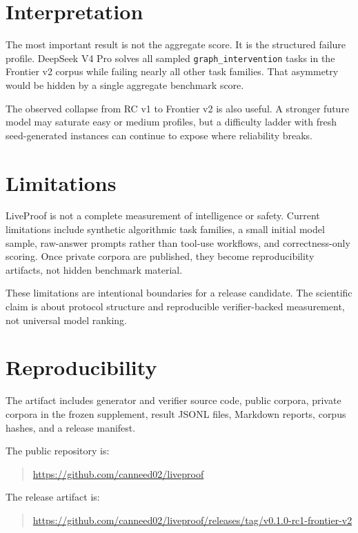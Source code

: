 \documentclass[11pt]{article}
\begin{document}
\section{Interpretation}

The most important result is not the aggregate score. It is the structured
failure profile. DeepSeek V4 Pro solves all sampled \texttt{graph\_intervention}
tasks in the Frontier v2 corpus while failing nearly all other task families.
That asymmetry would be hidden by a single aggregate benchmark score.

The observed collapse from RC v1 to Frontier v2 is also useful. A stronger
future model may saturate easy or medium profiles, but a difficulty ladder with
fresh seed-generated instances can continue to expose where reliability breaks.

\section{Limitations}

LiveProof is not a complete measurement of intelligence or safety. Current
limitations include synthetic algorithmic task families, a small initial model
sample, raw-answer prompts rather than tool-use workflows, and correctness-only
scoring. Once private corpora are published, they become reproducibility
artifacts, not hidden benchmark material.

These limitations are intentional boundaries for a release candidate. The
scientific claim is about protocol structure and reproducible verifier-backed
measurement, not universal model ranking.

\section{Reproducibility}

The artifact includes generator and verifier source code, public corpora,
private corpora in the frozen supplement, result JSONL files, Markdown reports,
corpus hashes, and a release manifest.

The public repository is:
\begin{quote}
\url{https://github.com/canneed02/liveproof}
\end{quote}

The release artifact is:
\begin{quote}
\url{https://github.com/canneed02/liveproof/releases/tag/v0.1.0-rc1-frontier-v2}
\end{quote}
\end{document}

